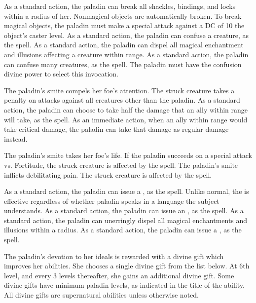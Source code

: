 As a standard action, the paladin can break all shackles, bindings, and locks within a \arealarge radius of her. Nonmagical objects are automatically broken. To break magical objects, the paladin must make a special attack against a DC of 10 \add the object's caster level.
 As a standard action, the paladin can confuse a creature, as the  spell.
 As a standard action, the paladin can dispel all magical enchantment and illusions affecting a creature within \rngmed range.
 As a standard action, the paladin can confuse many creatures, as the  spell. The paladin must have the confusion divine power to select this invocation.

 The paladin's smite compels her foe's attention. The struck creature takes a  penalty on attacks against all creatures other than the paladin.
 As a standard action, the paladin can choose to take half the damage that an ally within \rngmed range will take, as the  spell.
 As an immediate action, when an ally within \rngmed range would take critical damage, the paladin can take that damage as regular damage instead.

 The paladin's smite takes her foe's life. If the paladin succeeds on a special attack vs. Fortitude, the struck creature is affected by the  spell.
 The paladin's smite inflicts debilitating pain. The struck creature is affected by the  spell.

 As a standard action, the paladin can issue a , as the spell. Unlike normal, the  is effective regardless of whether paladin speaks in a language the subject understands.
 As a standard action, the paladin can issue an , as the spell.
 As a standard action, the paladin can unerringly dispel all magical enchantments and illusions within a \arealarge radius.
 As a standard action, the paladin can issue a , as the spell.

 The paladin's devotion to her ideals is rewarded with a divine gift which improves her abilities. She chooses a single divine gift from the list below. At 6th level, and every 3 levels thereafter, she gains an additional divine gift. Some divine gifts have minimum paladin levels, as indicated in the title of the ability. All divine gifts are supernatural abilities unless otherwise noted.

